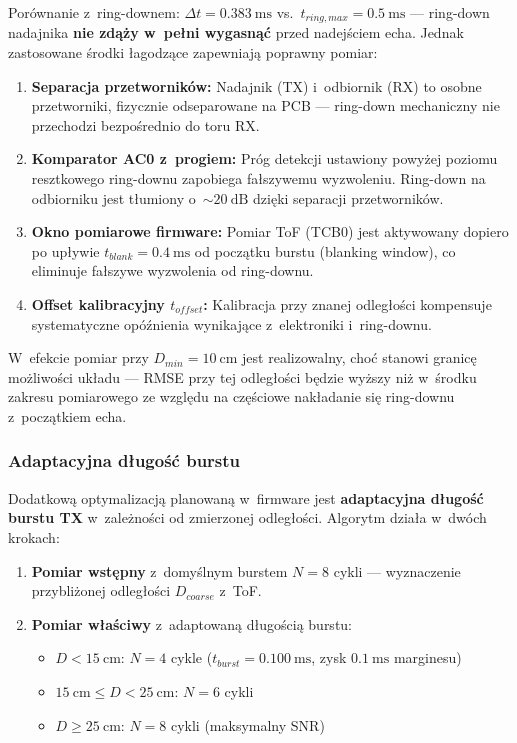 \documentclass[a4paper,11pt]{article}
\begin{document}
	Porównanie z~ring-downem: $\Delta t = \SI{0,383}{\milli\second}$
	vs.\ $t_{ring,max} = \SI{0,5}{\milli\second}$ --- ring-down nadajnika
	\textbf{nie zdąży w~pełni wygasnąć} przed nadejściem echa. Jednak
	zastosowane środki łagodzące zapewniają poprawny pomiar:
	
	\begin{enumerate}
		\item \textbf{Separacja przetworników:} Nadajnik (TX) i~odbiornik (RX)
		to osobne przetworniki, fizycznie odseparowane na PCB --- ring-down
		mechaniczny nie przechodzi bezpośrednio do toru RX.
		\item \textbf{Komparator AC0 z~progiem:} Próg detekcji ustawiony powyżej
		poziomu resztkowego ring-downu zapobiega fałszywemu wyzwoleniu.
		Ring-down na odbiorniku jest tłumiony o~${\sim}\SI{20}{\deci\bel}$
		dzięki separacji przetworników.
		\item \textbf{Okno pomiarowe firmware:} Pomiar ToF (TCB0) jest aktywowany
		dopiero po upływie $t_{blank} = \SI{0,4}{\milli\second}$ od początku
		burstu (blanking window), co eliminuje fałszywe wyzwolenia od
		ring-downu.
		\item \textbf{Offset kalibracyjny $t_{offset}$:} Kalibracja przy znanej
		odległości kompensuje systematyczne opóźnienia wynikające z~elektroniki
		i~ring-downu.
	\end{enumerate}
	
	W~efekcie pomiar przy $D_{min} = \SI{10}{\centi\metre}$ jest realizowalny,
	choć stanowi granicę możliwości układu --- RMSE przy tej odległości będzie
	wyższy niż w~środku zakresu pomiarowego ze względu na częściowe nakładanie
	się ring-downu z~początkiem echa.
	
	\subsubsection{Adaptacyjna długość burstu}
	\label{sec:adaptive_burst}
	
	Dodatkową optymalizacją planowaną w~firmware jest \textbf{adaptacyjna
		długość burstu TX} w~zależności od zmierzonej odległości. Algorytm działa
	w~dwóch krokach:
	
	\begin{enumerate}[nosep]
		\item \textbf{Pomiar wstępny} z~domyślnym burstem $N = 8$ cykli ---
		wyznaczenie przybliżonej odległości $D_{coarse}$ z~ToF.
		\item \textbf{Pomiar właściwy} z~adaptowaną długością burstu:
		\begin{itemize}[nosep]
			\item $D < \SI{15}{\centi\metre}$: $N = 4$ cykle
			($t_{burst} = \SI{0,100}{\milli\second}$, zysk
			$\SI{0,1}{\milli\second}$ marginesu)
			\item $\SI{15}{\centi\metre} \leq D < \SI{25}{\centi\metre}$:
			$N = 6$ cykli
			\item $D \geq \SI{25}{\centi\metre}$: $N = 8$ cykli
			(maksymalny SNR)
		\end{itemize}
	\end{enumerate}
	
\end{document}
